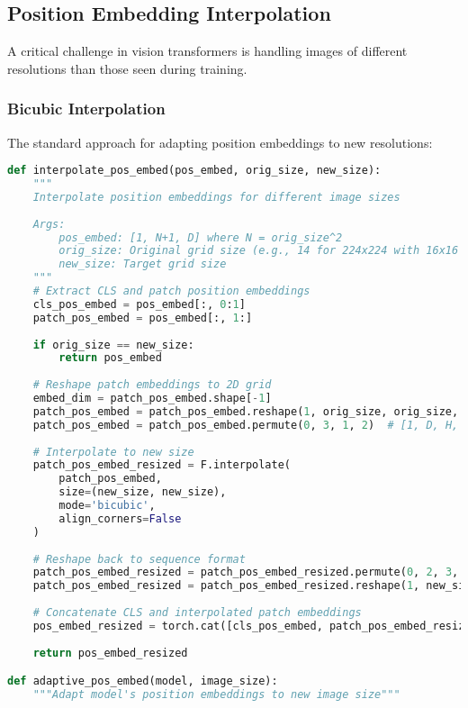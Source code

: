 \subsection{Position Embedding Interpolation}

A critical challenge in vision transformers is handling images of different resolutions than those seen during training.

\subsubsection{Bicubic Interpolation}

The standard approach for adapting position embeddings to new resolutions:

\begin{lstlisting}[language=Python, caption=Position embedding interpolation for different resolutions]
def interpolate_pos_embed(pos_embed, orig_size, new_size):
    """
    Interpolate position embeddings for different image sizes
    
    Args:
        pos_embed: [1, N+1, D] where N = orig_size^2
        orig_size: Original grid size (e.g., 14 for 224x224 with 16x16 patches)
        new_size: Target grid size
    """
    # Extract CLS and patch position embeddings
    cls_pos_embed = pos_embed[:, 0:1]
    patch_pos_embed = pos_embed[:, 1:]
    
    if orig_size == new_size:
        return pos_embed
    
    # Reshape patch embeddings to 2D grid
    embed_dim = patch_pos_embed.shape[-1]
    patch_pos_embed = patch_pos_embed.reshape(1, orig_size, orig_size, embed_dim)
    patch_pos_embed = patch_pos_embed.permute(0, 3, 1, 2)  # [1, D, H, W]
    
    # Interpolate to new size
    patch_pos_embed_resized = F.interpolate(
        patch_pos_embed,
        size=(new_size, new_size),
        mode='bicubic',
        align_corners=False
    )
    
    # Reshape back to sequence format
    patch_pos_embed_resized = patch_pos_embed_resized.permute(0, 2, 3, 1)
    patch_pos_embed_resized = patch_pos_embed_resized.reshape(1, new_size**2, embed_dim)
    
    # Concatenate CLS and interpolated patch embeddings
    pos_embed_resized = torch.cat([cls_pos_embed, patch_pos_embed_resized], dim=1)
    
    return pos_embed_resized

def adaptive_pos_embed(model, image_size):
    """Adapt model's position embeddings to new image size"""
    

\end{lstlisting}
